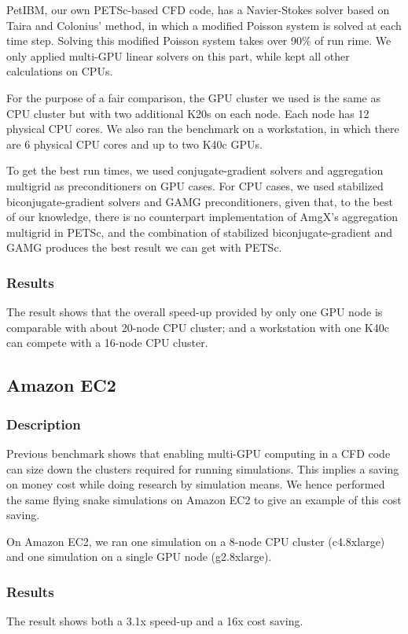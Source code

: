     PetIBM, our own PETSc-based CFD code, has a Navier-Stokes solver based on 
    Taira and Colonius' method\cite{Taira-2007-ID69}, in which a modified 
    Poisson system is solved at each time step.
    Solving this modified Poisson system takes over 90\% of run rime.
    We only applied multi-GPU linear solvers on this part, while kept all other
    calculations on CPUs.

    For the purpose of a fair comparison,
    the GPU cluster we used is the same as CPU cluster but with two additional
    K20s on each node.
    Each node has 12 physical CPU cores.
    We also ran the benchmark on a workstation, in which there are 6 physical 
    CPU cores and up to two K40c GPUs.

    To get the best run times, we used conjugate-gradient solvers and 
    aggregation multigrid as preconditioners on GPU cases.
    For CPU cases, we used stabilized biconjugate-gradient solvers and GAMG 
    preconditioners, given that, to the best of our knowledge, there is no 
    counterpart implementation of AmgX's aggregation multigrid in PETSc,
    and the combination of stabilized biconjugate-gradient and GAMG produces 
    the best result we can get with PETSc.

    \subsubsection{Results}
    The result shows that the overall speed-up provided by only one GPU node is 
    comparable with about 20-node CPU cluster; 
    and a workstation with one K40c can compete with a 16-node CPU cluster.

\subsection{Amazon EC2}

    \subsubsection{Description}
    Previous benchmark shows that enabling multi-GPU computing in a CFD code can
    size down the clusters required for running simulations.
    This implies a saving on money cost while doing research by simulation means.
    We hence performed the same flying snake simulations on Amazon EC2 to give 
    an example of this cost saving.

    On Amazon EC2, we ran one simulation on a 8-node CPU cluster (c4.8xlarge)
    and one simulation on a single GPU node (g2.8xlarge). 

    \subsubsection{Results}
    The result shows both a 3.1x speed-up and a 16x cost saving.


